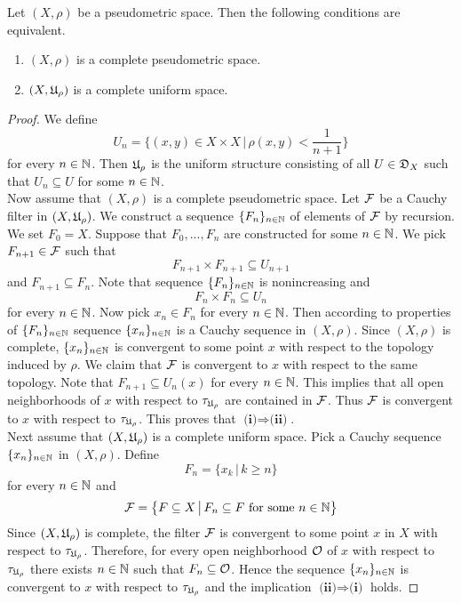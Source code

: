 \begin{theorem}\label{theorem:complete_pseudometric_spaces}
Let $(X,\rho)$ be a pseudometric space. Then the following conditions are equivalent.
\begin{enumerate}[label=\emph{\textbf{(\roman*)}}, leftmargin=*]
\item $(X,\rho)$ is a complete pseudometric space. 
\item $(X,{\mathfrak U}_{\rho})$ is a complete uniform space.
\end{enumerate}
\end{theorem}
\begin{proof}
We define 
$$U_{n} = \bigg\{(x,y)\in X\times X\,\bigg|\,\rho(x,y) < \frac{1}{n + 1}\bigg\}$$
for every $n\in {\mathbb N}$. Then ${\mathfrak U}_{\rho}$ is the uniform structure consisting of all $U \in {\mathfrak D}_X$ such that $U_n\subseteq U$ for some $n\in {\mathbb N}$.\\
Now assume that $(X,\rho)$ is a complete pseudometric space. Let ${\mathcal F}$ be a Cauchy filter in $\left(X,{\mathfrak U}_{\rho}\right)$. We construct a sequence $\{F_n\}_{n\in {\mathbb N}}$ of elements of ${\mathcal F}$ by recursion. We set $F_0 = X$. Suppose that $F_0,...,F_n$ are constructed for some $n\in {\mathbb N}$. We pick $F_{n+1}\in {\mathcal F}$ such that 
$$F_{n+1}\times F_{n+1} \subseteq U_{n+1}$$
and $F_{n+1} \subseteq F_n$. Note that sequence $\{F_n\}_{n\in {\mathbb N}}$ is nonincreasing and
$$F_{n}\times F_{n} \subseteq U_n$$
for every $n\in {\mathbb N}$. Now pick $x_n\in F_n$ for every $n\in {\mathbb N}$. Then according to properties of $\{F_n\}_{n\in {\mathbb N}}$ sequence $\{x_n\}_{n\in {\mathbb N}}$ is a Cauchy sequence in $(X,\rho)$. Since $(X,\rho)$ is complete, $\{x_n\}_{n\in {\mathbb N}}$ is convergent to some point $x$ with respect to the topology induced by $\rho$. We claim that ${\mathcal F}$ is convergent to $x$ with respect to the same topology. Note that $F_{n+1} \subseteq U_n(x)$ for every $n\in {\mathbb N}$. This implies that all open neighborhoods of $x$ with respect to $\tau_{{\mathfrak U}_{\rho}}$ are contained in ${\mathcal F}$. Thus ${\mathcal F}$ is convergent to $x$ with respect to $\tau_{{\mathfrak U}_{\rho}}$. This proves that $\textbf{(i)}\Rightarrow \textbf{(ii)}$.\\
Next assume that $(X,{\mathfrak U}_{\rho})$ is a complete uniform space. Pick a Cauchy sequence $\{x_n\}_{n\in {\mathbb N}}$ in $(X,\rho)$. Define
$$F_n = \big\{x_k\,\big|\,k\geq n\big\}$$
for every $n\in {\mathbb N}$ and
$${\mathcal F} = \big\{F\subseteq X\,\big|\,F_n\subseteq F\mbox{ for some }n\in {\mathbb N}\big\}$$
Since $(X,{\mathfrak U}_{\rho})$ is complete, the filter ${\mathcal F}$ is convergent to some point $x$ in $X$ with respect to $\tau_{{\mathfrak U}_{\rho}}$. Therefore, for every open neighborhood ${\mathcal O}$ of $x$ with respect to $\tau_{{\mathfrak U}_{\rho}}$ there exists $n\in {\mathbb N}$ such that $F_n \subseteq {\mathcal O}$. Hence the sequence $\{x_n\}_{n\in {\mathbb N}}$ is convergent to $x$ with respect to $\tau_{{\mathfrak U}_{\rho}}$ and the implication $\textbf{(ii)}\Rightarrow \textbf{(i)}$ holds.
\end{proof}

